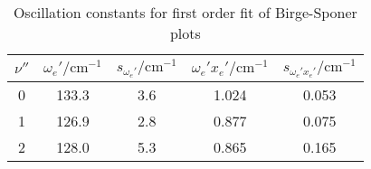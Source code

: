 \begin{table}[H]
\caption{Oscillation constants for first order fit of Birge-Sponer plots}
\begin{center}
\begin{tabular}{|c|c|c|c|c|}
  \hline
  $\nu''$ & $\omega_e' / \text{cm}^{-1}$ & $s_{\omega_e'} / \text{cm}^{-1}$ & $\omega_e' x_e' / \text{cm}^{-1}$ & $s_{\omega_e' x_e'} / \text{cm}^{-1}$ \\ \hline
  0 & 133.3 & 3.6 & 1.024 & 0.053 \\ \hline
  1 & 126.9 & 2.8 & 0.877 & 0.075 \\ \hline
  2 & 128.0 & 5.3 & 0.865 & 0.165 \\ \hline
\end{tabular}
\end{center}
\label{tab:prog1ord}
\end{table}
